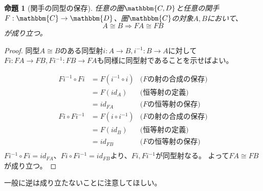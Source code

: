 \documentclass[uplatex,dvipdfmx]{jsarticle}
\newcommand{\cat}[1]{\mathbbm{#1}}
\newcommand{\arrow}{\rightarrow}
\newcommand{\functor}[3]{#1:\cat{#2}\arrow \cat{#3}}
\newcommand{\mor}[3]{#1:#2\arrow #3}
\newtheorem{proof}{証明}[section]
\newtheorem{prop}[proof]{命題}
\numberwithin{proof}{subsection}
\begin{document}
	\begin{prop}[関手の同型の保存]
		任意の圏$\cat{C,D}$と任意の関手$\functor{F}{C}{D}$、圏$\cat{C}$の対象$A,B$において、
		\[A\cong B \Longrightarrow FA\cong FB\]が成り立つ。
	\end{prop}
	\begin{proof}
		同型$A\cong B$のある同型射$\mor{i}{A}{B},\mor{i^{-1}}{B}{A}$に対して$\mor{Fi}{FA}{FB},\mor{Fi^{-1}}{FB}{FA}$も同様に同型射であることを示せばよい。

		\begin{align*}
			Fi^{-1}\circ Fi&=F(i^{-1}\circ i)&\text{($F$の射の合成の保存)}\\
			&=F(id_A)&\text{(恒等射の定義)}\\
			&=id_{FA}&\text{($F$の恒等射の保存)}\\
			Fi\circ Fi^{-1}&=F(i\circ i^{-1})&\text{($F$の射の合成の保存)}\\
			&=F(id_B)&\text{(恒等射の定義)}\\
			&=id_{FB}&\text{($F$の恒等射の保存)}\\
		\end{align*}
		$Fi^{-1}\circ Fi=id_{FA}$、$Fi\circ Fi^{-1}=id_{FB}$より、$Fi,Fi^{-1}$が同型射なる。
		よって$FA\cong FB$が成り立つ。
	\end{proof}
  一般に逆は成り立たないことに注意してほしい。
\end{document}
